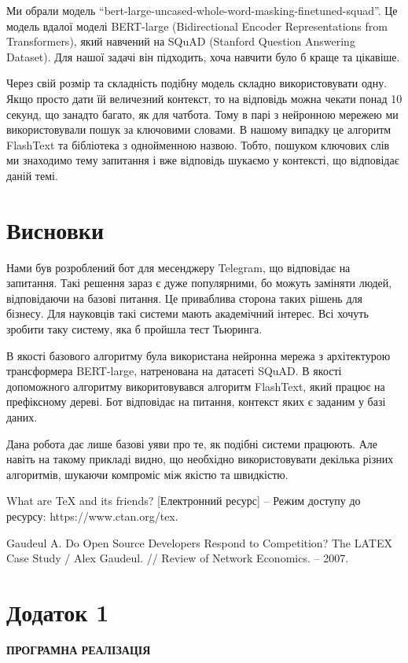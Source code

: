 \documentclass[a4paper,14pt]{extreport}
\newcommand\chap[1]{%
  \chapter*{#1}%
  \addcontentsline{toc}{chapter}{\uppercase{#1}}}
\begin{document}
    Ми обрали модель ``bert-large-uncased-whole-word-masking-finetuned-squad''. Це модель вдалої моделі BERT-large (Bidirectional Encoder Representations from Transformers), який навчений на SQuAD (Stanford Question Answering Dataset). Для нашої задачі він підходить, хоча навчити було б краще та цікавіше.

    Через свій розмір та складність подібну модель складно використовувати одну. Якщо просто дати їй величезний контекст, то на відповідь можна чекати понад 10 секунд, що занадто багато, як для чатбота. Тому в парі з нейронною мережею ми використовували пошук за ключовими словами. В нашому випадку це алгоритм FlashText та бібліотека з однойменною назвою. Тобто, пошуком ключових слів ми знаходимо тему запитання і вже відповідь шукаємо у контексті, що відповідає даній темі.

\chap{Висновки}
    Нами був розроблений бот для месенджеру Telegram, що відповідає на запитання. Такі решення зараз є дуже популярними, бо можуть заміняти людей, відповідаючи на базові питання. Це приваблива сторона таких рішень для бізнесу. Для науковців такі системи мають академічний інтерес. Всі хочуть зробити таку систему, яка б пройшла тест Тьюринга.
    
    В якості базового алгоритму була використана нейронна мережа з архітектурою трансформера BERT-large, натренована на датасеті SQuAD. В якості допоможного алгоритму викоритовувався алгоритм FlashText, який працює на префіксному дереві. Бот відповідає на питання, контекст яких є заданим у базі даних.

    Дана робота дає лише базові уяви про те, як подібні системи працюють. Але навіть на такому прикладі видно, що необхідно використовувати декілька різних алгоритмів, шукаючи компроміс між якістю та швидкістю.

\newpage
\renewcommand\bibname{ПЕРЕЛІК ДЖЕРЕЛ ПОСИЛАННЯ}
\begin{thebibliography}{9}
    What are TeX and its friends? [Електронний ресурс] – Режим доступу до ресурсу: https://www.ctan.org/tex.

    Gaudeul A. Do Open Source Developers Respond to Competition? The LATEX Case Study / Alex Gaudeul. // Review of Network Economics. – 2007.

\end{thebibliography}

\newpage

\chap{Додаток 1}
\centerline{\uppercase{\bf{Програмна реалізація}}}
    \inputminted[breaklines,linenos=true]{python}{../../src/app.py}
\end{document}

